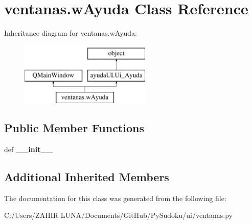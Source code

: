 \hypertarget{classventanas_1_1w_ayuda}{\section{ventanas.\-w\-Ayuda Class Reference}
\label{classventanas_1_1w_ayuda}
}
Inheritance diagram for ventanas.\-w\-Ayuda\-:\begin{figure}[H]
\begin{center}
\leavevmode
\includegraphics[height=3.000000cm]{classventanas_1_1w_ayuda}
\end{center}
\end{figure}
\subsection*{Public Member Functions}
\begin{DoxyCompactItemize}
\item 
\hypertarget{classventanas_1_1w_ayuda_a75ddc112e68887106f7964a7788f5d90}{def {\bfseries \-\_\-\-\_\-init\-\_\-\-\_\-}}\label{classventanas_1_1w_ayuda_a75ddc112e68887106f7964a7788f5d90}

\end{DoxyCompactItemize}
\subsection*{Additional Inherited Members}


The documentation for this class was generated from the following file\-:\begin{DoxyCompactItemize}
\item 
C\-:/\-Users/\-Z\-A\-H\-I\-R  L\-U\-N\-A/\-Documents/\-Git\-Hub/\-Py\-Sudoku/ui/ventanas.\-py\end{DoxyCompactItemize}
